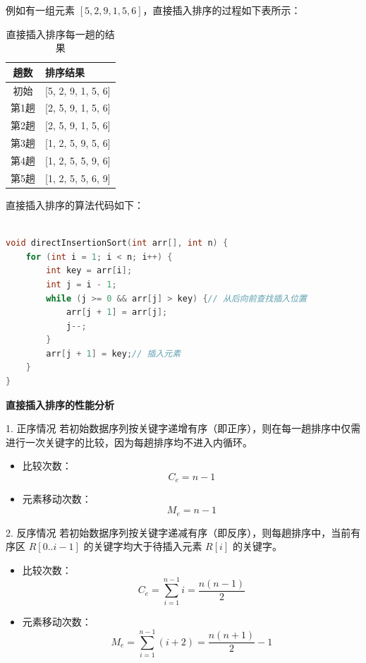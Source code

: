 \documentclass[lang=cn,newtx,10pt,scheme=chinese]{elegantbook}
\begin{document}
例如有一组元素 $[5, 2, 9, 1, 5, 6]$，直接插入排序的过程如下表所示：

\begin{table}[h!]
\centering
\caption{直接插入排序每一趟的结果}
\label{tab:directInsertionSort}
\begin{tabular}{|c|l|}
\hline
\textbf{趟数} & \textbf{排序结果} \\ \hline
初始 & [5, 2, 9, 1, 5, 6] \\ \hline
第1趟 & [2, 5, 9, 1, 5, 6] \\ \hline
第2趟 & [2, 5, 9, 1, 5, 6] \\ \hline
第3趟 & [1, 2, 5, 9, 5, 6] \\ \hline
第4趟 & [1, 2, 5, 5, 9, 6] \\ \hline
第5趟 & [1, 2, 5, 5, 6, 9] \\ \hline
\end{tabular}
\end{table}

直接插入排序的算法代码如下：
\begin{lstlisting}[language=C++, caption=直接插入排序的算法代码]

void directInsertionSort(int arr[], int n) {
    for (int i = 1; i < n; i++) {
        int key = arr[i];
        int j = i - 1;
        while (j >= 0 && arr[j] > key) {// 从后向前查找插入位置
            arr[j + 1] = arr[j];
            j--;
        }
        arr[j + 1] = key;// 插入元素
    }
}
\end{lstlisting}

\textbf{直接插入排序的性能分析}

1. 正序情况  
   若初始数据序列按关键字递增有序（即正序），则在每一趟排序中仅需进行一次关键字的比较，因为每趟排序均不进入内循环。  
   \begin{itemize}
     \item 比较次数：  
       \[
       C_e = n - 1
       \]
     \item 元素移动次数：  
       \[
       M_e = n - 1
       \]
   \end{itemize}

2. 反序情况  
   若初始数据序列按关键字递减有序（即反序），则每趟排序中，当前有序区 $R[0..i-1]$ 的关键字均大于待插入元素 $R[i]$ 的关键字。  
   \begin{itemize}
     \item 比较次数：  
       \[
       C_e = \sum_{i=1}^{n-1} i = \frac{n(n-1)}{2}
       \]
     \item 元素移动次数：  
       \[
       M_e = \sum_{i=1}^{n-1} (i + 2) = \frac{n(n+1)}{2} - 1
       \]
   \end{itemize}
\end{document}
